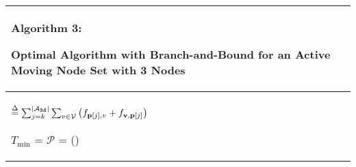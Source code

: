 \documentclass[10pt,conference]{IEEEtran}
\begin{document}
\begin{algorithm}[t]

\begin{tabular}[c]{p{8cm}}


\hline
{\scriptsize \begin{bf}Algorithm 3: \end{bf} Optimal Algorithm with
  Branch-and-Bound for an Active Moving Node Set with 3 Nodes}\\

\hline


{\scriptsize
\KwIn{
Non-moving node subgraph, $\mathcal{G}'=
    \{\mathcal{V}',\mathcal{E}'\}$; active moving node set \AM;
    initial graph $\mathcal{G}_{i}$
}
\SetKwFunction{AT}{AggregateTraffic}
\SetKwFunction{AN}{AttachNode}
\SetKwFunction{GAP}{GetAllPermutations}
\SetKwFunction{RF}{RemainingFlows}

\RF{$\mathcal{G},\mathbf{p},k$} $\overset{\Delta}{=}
\sum_{j=k}^{|\mathbf{\mathcal{A}_M }|} \sum_{v \in \mathcal{V}} \left( f_{\mathbf{p}[j],v} +
  f_{\mathbf{v,p}[j]} \right)$\;

$T_{\min}$ = \AT{$\mathcal{G}_{i}$}\;
$\mathcal{P}$ = \GAP(\AM )\;



\ForEach{$\mathbf{p} \in \mathcal{P}$}{

\ForEach{$u \in \mathcal{G}'$}{

$\mathcal{G}'_{1}$ = \AN{$\mathbf{p}[1],u,\mathcal{G}'$}\;
 $T$ = \AT{$\mathcal{G}'_{1}$}\;

\ForEach{$u \in \mathcal{G}'_1$}{
 $B_L =  T + $\RF{$\mathcal{G}'_1,\mathbf{p}, 2$}\;

\eIf{
  $(\underset{\mathcal{G}_{i} \rightarrow
    \mathcal{G}'_{1}}{d}(\mathbf{p}[1])
  \leq h_{\mathbf{p}[1]}) \&\&  (B_L < T_{\min}) $}
{
  $\mathcal{G}'_{2}$ = \AN{$\mathbf{p}[2],u,\mathcal{G}'_{1}$}\;
  $T$ = \AT{$\mathcal{G}'_{2}$}\;
  \ForEach{$u \in \mathcal{G}'_{2}$}{
 $B_L =  T + $\RF{$\mathcal{G}'_2,\mathbf{p}, 3$}\;
\eIf{$(\underset{\mathcal{G}_{i} \rightarrow \mathcal{G}'_{2}}{d}(\mathbf{p}[2])
  \leq h_{\mathbf{p}[2]}) \&\&  (B_L< T_{\min}) $}
{
  $\mathcal{G}'_{3}$ = \AN{$\mathbf{p}[3],u,\mathcal{G}'_{2}$}\;
  $T$ = \AT{$\mathcal{G}'_{3}$}\;
  \If{$(\underset{\mathcal{G}_{i} \rightarrow
\mathcal{G}'_{3}}{d}(\mathbf{p}[3]) \leq h_{\mathbf{p}[3]}) \&\& (T <
T_{\min}$)} {
  $T_{\min} = T$\;
  \AM.anchorlabel = GetAnchorLabel()\;
  \AM.desiredlabel =
  GetDesiredLabel()\;
}
}{break\;}} }{break\;}

}

}

}

}
\\
\hline


\end{tabular}

\end{algorithm}
\end{document}
